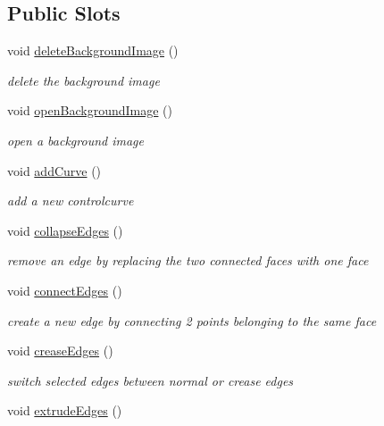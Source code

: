 \subsection*{Public Slots}
\begin{DoxyCompactItemize}
\item 
void \hyperlink{classShipCAD_1_1Controller_a766535d7bc29bf81b3b75808be19a0d0}{delete\+Background\+Image} ()
\begin{DoxyCompactList}\small\item\em delete the background image \end{DoxyCompactList}\item 
void \hyperlink{classShipCAD_1_1Controller_af1267c2c5892ba0a6f34414e241f00ea}{open\+Background\+Image} ()
\begin{DoxyCompactList}\small\item\em open a background image \end{DoxyCompactList}\item 
void \hyperlink{classShipCAD_1_1Controller_acab9a8ee41a93303233c2cb70afa6cc1}{add\+Curve} ()
\begin{DoxyCompactList}\small\item\em add a new controlcurve \end{DoxyCompactList}\item 
void \hyperlink{classShipCAD_1_1Controller_a31ded45e333650203b2bee587e55a7ed}{collapse\+Edges} ()
\begin{DoxyCompactList}\small\item\em remove an edge by replacing the two connected faces with one face \end{DoxyCompactList}\item 
void \hyperlink{classShipCAD_1_1Controller_a8713ccaf7dccce2284dd86c9b7aa9bc0}{connect\+Edges} ()
\begin{DoxyCompactList}\small\item\em create a new edge by connecting 2 points belonging to the same face \end{DoxyCompactList}\item 
void \hyperlink{classShipCAD_1_1Controller_a8fbe457b09df7d49442f58c97b2c50f3}{crease\+Edges} ()
\begin{DoxyCompactList}\small\item\em switch selected edges between normal or crease edges \end{DoxyCompactList}\item 
void \hyperlink{classShipCAD_1_1Controller_ab3698ec4918b622cba53a33f96c57e73}{extrude\+Edges} ()

\end{DoxyCompactItemize}
